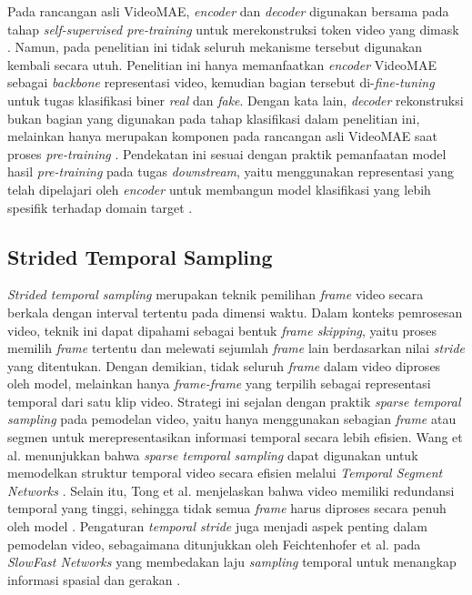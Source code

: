 Pada rancangan asli VideoMAE, \textit{encoder} dan \textit{decoder} digunakan bersama pada tahap \textit{self-supervised pre-training} untuk merekonstruksi token video yang dimask \cite{tong2022videomaemaskedautoencodersdataefficient}. Namun, pada penelitian ini tidak seluruh mekanisme tersebut digunakan kembali secara utuh. Penelitian ini hanya memanfaatkan \textit{encoder} VideoMAE sebagai \textit{backbone} representasi video, kemudian bagian tersebut di-\textit{fine-tuning} untuk tugas klasifikasi biner \textit{real} dan \textit{fake}. Dengan kata lain, \textit{decoder} rekonstruksi bukan bagian yang digunakan pada tahap klasifikasi dalam penelitian ini, melainkan hanya merupakan komponen pada rancangan asli VideoMAE saat proses \textit{pre-training} \cite{tong2022videomaemaskedautoencodersdataefficient}. Pendekatan ini sesuai dengan praktik pemanfaatan model hasil \textit{pre-training} pada tugas \textit{downstream}, yaitu menggunakan representasi yang telah dipelajari oleh \textit{encoder} untuk membangun model klasifikasi yang lebih spesifik terhadap domain target \cite{tong2022videomaemaskedautoencodersdataefficient}\cite{hu2024delocatedetectionlocalizationdeepfake}. \par

\subsection{Strided Temporal Sampling} \label{II.Teori6.1}
\textit{Strided temporal sampling} merupakan teknik pemilihan \textit{frame} video secara berkala dengan interval tertentu pada dimensi waktu. Dalam konteks pemrosesan video, teknik ini dapat dipahami sebagai bentuk \textit{frame skipping}, yaitu proses memilih \textit{frame} tertentu dan melewati sejumlah \textit{frame} lain berdasarkan nilai \textit{stride} yang ditentukan. Dengan demikian, tidak seluruh \textit{frame} dalam video diproses oleh model, melainkan hanya \textit{frame-frame} yang terpilih sebagai representasi temporal dari satu klip video. Strategi ini sejalan dengan praktik \textit{sparse temporal sampling} pada pemodelan video, yaitu hanya menggunakan sebagian \textit{frame} atau segmen untuk merepresentasikan informasi temporal secara lebih efisien. Wang et al. menunjukkan bahwa \textit{sparse temporal sampling} dapat digunakan untuk memodelkan struktur temporal video secara efisien melalui \textit{Temporal Segment Networks} \cite{wang2016temporalsegmentnetworksgood}. Selain itu, Tong et al. menjelaskan bahwa video memiliki redundansi temporal yang tinggi, sehingga tidak semua \textit{frame} harus diproses secara penuh oleh model \cite{tong2022videomaemaskedautoencodersdataefficient}. Pengaturan \textit{temporal stride} juga menjadi aspek penting dalam pemodelan video, sebagaimana ditunjukkan oleh Feichtenhofer et al. pada \textit{SlowFast Networks} yang membedakan laju \textit{sampling} temporal untuk menangkap informasi spasial dan gerakan \cite{feichtenhofer2019slowfastnetworksvideorecognition}. \par

